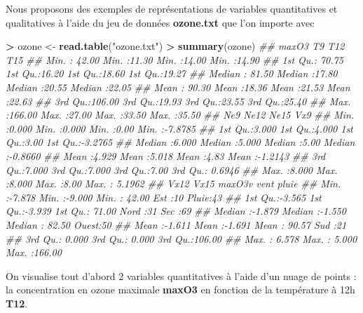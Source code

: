 \documentclass[]{book}
\newenvironment{Shaded}{\begin{snugshade}}{\end{snugshade}}
\newcommand{\CommentTok}[1]{\textcolor[rgb]{0.56,0.35,0.01}{\textit{#1}}}
\newcommand{\KeywordTok}[1]{\textcolor[rgb]{0.13,0.29,0.53}{\textbf{#1}}}
\newcommand{\NormalTok}[1]{#1}
\newcommand{\OperatorTok}[1]{\textcolor[rgb]{0.81,0.36,0.00}{\textbf{#1}}}
\newcommand{\StringTok}[1]{\textcolor[rgb]{0.31,0.60,0.02}{#1}}
\theoremstyle{definition}
\theoremstyle{definition}
\theoremstyle{definition}
\theoremstyle{remark}
\begin{document}
Nous proposons des exemples de représentations de variables quantitatives et qualitatives à l'aide du jeu de données \textbf{ozone.txt} que l'on importe avec

\begin{Shaded}
\begin{Highlighting}[]
\OperatorTok{>}\StringTok{ }\NormalTok{ozone <-}\StringTok{ }\KeywordTok{read.table}\NormalTok{(}\StringTok{"ozone.txt"}\NormalTok{)}
\OperatorTok{>}\StringTok{ }\KeywordTok{summary}\NormalTok{(ozone)}
\CommentTok{##      maxO3              T9             T12             T15       }
\CommentTok{##  Min.   : 42.00   Min.   :11.30   Min.   :14.00   Min.   :14.90  }
\CommentTok{##  1st Qu.: 70.75   1st Qu.:16.20   1st Qu.:18.60   1st Qu.:19.27  }
\CommentTok{##  Median : 81.50   Median :17.80   Median :20.55   Median :22.05  }
\CommentTok{##  Mean   : 90.30   Mean   :18.36   Mean   :21.53   Mean   :22.63  }
\CommentTok{##  3rd Qu.:106.00   3rd Qu.:19.93   3rd Qu.:23.55   3rd Qu.:25.40  }
\CommentTok{##  Max.   :166.00   Max.   :27.00   Max.   :33.50   Max.   :35.50  }
\CommentTok{##       Ne9             Ne12            Ne15           Vx9         }
\CommentTok{##  Min.   :0.000   Min.   :0.000   Min.   :0.00   Min.   :-7.8785  }
\CommentTok{##  1st Qu.:3.000   1st Qu.:4.000   1st Qu.:3.00   1st Qu.:-3.2765  }
\CommentTok{##  Median :6.000   Median :5.000   Median :5.00   Median :-0.8660  }
\CommentTok{##  Mean   :4.929   Mean   :5.018   Mean   :4.83   Mean   :-1.2143  }
\CommentTok{##  3rd Qu.:7.000   3rd Qu.:7.000   3rd Qu.:7.00   3rd Qu.: 0.6946  }
\CommentTok{##  Max.   :8.000   Max.   :8.000   Max.   :8.00   Max.   : 5.1962  }
\CommentTok{##       Vx12             Vx15            maxO3v          vent      pluie   }
\CommentTok{##  Min.   :-7.878   Min.   :-9.000   Min.   : 42.00   Est  :10   Pluie:43  }
\CommentTok{##  1st Qu.:-3.565   1st Qu.:-3.939   1st Qu.: 71.00   Nord :31   Sec  :69  }
\CommentTok{##  Median :-1.879   Median :-1.550   Median : 82.50   Ouest:50             }
\CommentTok{##  Mean   :-1.611   Mean   :-1.691   Mean   : 90.57   Sud  :21             }
\CommentTok{##  3rd Qu.: 0.000   3rd Qu.: 0.000   3rd Qu.:106.00                        }
\CommentTok{##  Max.   : 6.578   Max.   : 5.000   Max.   :166.00}
\end{Highlighting}
\end{Shaded}

On visualise tout d'abord 2 variables quantitatives à l'aide d'un nuage de points : la concentration en ozone maximale \textbf{maxO3} en fonction de la température à 12h \textbf{T12}.
\end{document}
